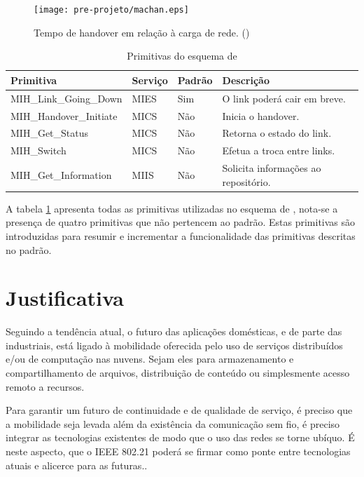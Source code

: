 \documentclass[12pt]{article}
\begin{document}
\begin{figure}[h!]
	\centering
	\texttt{[image: pre-projeto/machan.eps]}
	\caption{Tempo de handover em relação à carga de rede.  
	(\cite{machan:2008})}
	\label{fig:machan}
\end{figure}

\begin{table}[h!]
	\centering
	\caption{Primitivas do esquema de \cite{tawil:2008}}
	\label{tab:tawil-primitivas}
	\begin{tabular}[b]{ l | l | l | l }
		Primitiva & Serviço & Padrão & Descrição \\
		\hline
		MIH\_Link\_Going\_Down   & MIES & Sim & O link poderá cair em breve. \\
		 MIH\_Handover\_Initiate & MICS & Não & Inicia o handover. \\
		MIH\_Get\_Status         & MICS & Não & Retorna o estado do link. \\
		MIH\_Switch              & MICS & Não & Efetua a troca entre links. \\
		MIH\_Get\_Information    & MIIS & Não & Solicita informações ao		
		repositório.\\
		\hline
	\end{tabular}
\end{table}

A tabela \ref{tab:tawil-primitivas} apresenta todas as primitivas utilizadas 
no esquema de \cite{tawil:2008}, nota-se a presença de quatro primitivas que 
não pertencem ao padrão. Estas primitivas são introduzidas para resumir e 
incrementar a funcionalidade das primitivas descritas no padrão.


\section{Justificativa} \label{sec:justificativa} %

Seguindo a tendência atual, o futuro das aplicações domésticas, e de parte das 
industriais, está ligado à mobilidade oferecida pelo uso de serviços 
distribuídos e/ou de computação nas nuvens. Sejam eles para armazenamento e 
compartilhamento de arquivos, distribuição de conteúdo ou simplesmente acesso 
remoto a recursos.

Para garantir um futuro de continuidade e de qualidade de serviço, é preciso 
que a mobilidade seja levada além da existência da comunicação sem fio, é 
preciso integrar as tecnologias existentes de modo que o uso das redes se 
torne ubíquo.  É neste aspecto, que o IEEE 802.21 poderá se firmar como ponte 
entre tecnologias atuais e alicerce para as futuras..
\end{document}
